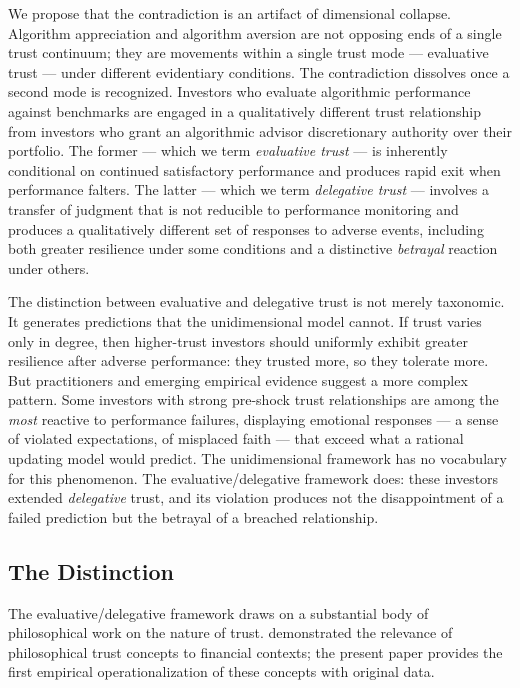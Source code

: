 We propose that the contradiction is an artifact of dimensional collapse. Algorithm appreciation and algorithm aversion are not opposing ends of a single trust continuum; they are movements within a single trust mode --- evaluative trust --- under different evidentiary conditions. The contradiction dissolves once a second mode is recognized. Investors who evaluate algorithmic performance against benchmarks are engaged in a qualitatively different trust relationship from investors who grant an algorithmic advisor discretionary authority over their portfolio. The former --- which we term \textit{evaluative trust} --- is inherently conditional on continued satisfactory performance and produces rapid exit when performance falters. The latter --- which we term \textit{delegative trust} --- involves a transfer of judgment that is not reducible to performance monitoring and produces a qualitatively different set of responses to adverse events, including both greater resilience under some conditions and a distinctive \textit{betrayal} reaction under others.

The distinction between evaluative and delegative trust is not merely taxonomic. It generates predictions that the unidimensional model cannot. If trust varies only in degree, then higher-trust investors should uniformly exhibit greater resilience after adverse performance: they trusted more, so they tolerate more. But practitioners and emerging empirical evidence suggest a more complex pattern. Some investors with strong pre-shock trust relationships are among the \textit{most} reactive to performance failures, displaying emotional responses --- a sense of violated expectations, of misplaced faith --- that exceed what a rational updating model would predict. The unidimensional framework has no vocabulary for this phenomenon. The evaluative/delegative framework does: these investors extended \textit{delegative} trust, and its violation produces not the disappointment of a failed prediction but the betrayal of a breached relationship.


\subsection{The Distinction}
\label{subsec:distinction}

The evaluative/delegative framework draws on a substantial body of philosophical work on the nature of trust. \citet{CarterSpencerSimion2020} demonstrated the relevance of philosophical trust concepts to financial contexts; the present paper provides the first empirical operationalization of these concepts with original data.


